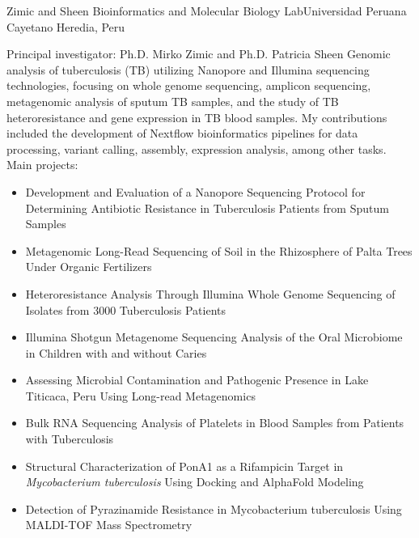 \documentclass[11pt,a4paper,sans]{moderncv}
\begin{document}
  {Zimic and Sheen Bioinformatics and Molecular Biology Lab}{Universidad Peruana Cayetano Heredia, Peru}
  {}
  {Principal investigator: Ph.D. Mirko Zimic and  Ph.D. Patricia Sheen\newline{}%
  Genomic analysis of tuberculosis (TB) utilizing Nanopore and Illumina sequencing 
  technologies, focusing on whole genome sequencing, amplicon sequencing, metagenomic 
  analysis of sputum TB samples, and the study of TB heteroresistance and gene 
  expression in TB blood samples. My contributions included the development of 
  Nextflow bioinformatics pipelines for data processing, 
  variant calling, assembly, expression analysis, among other tasks.
  Main projects:%
  \begin{itemize}%
  \item Development and Evaluation of a Nanopore Sequencing Protocol for Determining Antibiotic Resistance in Tuberculosis Patients from Sputum Samples
  \item Metagenomic Long-Read Sequencing of Soil in the Rhizosphere of Palta Trees Under Organic Fertilizers
  \item Heteroresistance Analysis Through Illumina Whole Genome Sequencing of Isolates from 3000 Tuberculosis Patients
  \item Illumina Shotgun Metagenome Sequencing Analysis of the Oral Microbiome in Children with and without Caries
  \item Assessing Microbial Contamination and Pathogenic Presence in Lake Titicaca, Peru Using Long-read Metagenomics
  \item Bulk RNA Sequencing Analysis of Platelets in Blood Samples from Patients with Tuberculosis
  \item Structural Characterization of PonA1 as a Rifampicin Target in \textit{Mycobacterium tuberculosis} Using Docking and AlphaFold Modeling
  \end{itemize}
}
\cventry{}{}
  {}{}{}
  {\begin{itemize}%
    \item Detection of Pyrazinamide Resistance in Mycobacterium tuberculosis Using MALDI-TOF Mass Spectrometry
  \end{itemize}
  }
\end{document}
